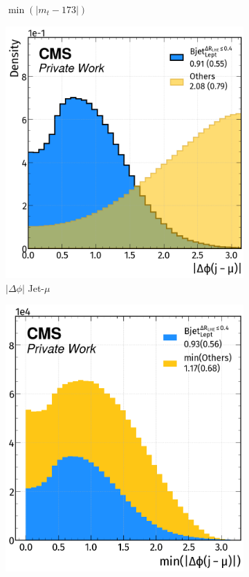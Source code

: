 \begin{figure}[H]
\begin{subfigure}{0.47\linewidth}
        \caption{$\min(|m_t-173|)$}
    \end{subfigure}  
     \begin{subfigure}{0.49\linewidth}
        \centering
        \includegraphics[width=1\linewidth]{fig//chap08-kin_reco/dphi_mu.png}
        \caption{$|\Delta \phi|$ Jet-$\mu$}
    \end{subfigure}
    \hfill
    \begin{subfigure}{0.46\linewidth}  
        \centering
        \includegraphics[width=1\linewidth]{fig//chap08-kin_reco/min_dphi_mu.png}

\end{subfigure}
\end{figure}
